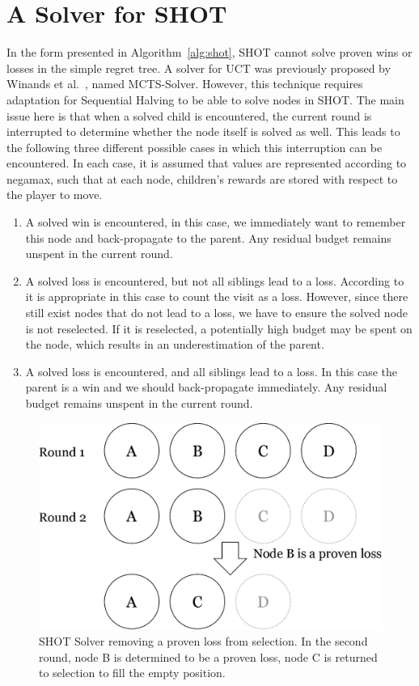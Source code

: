 \documentclass{icga}
\begin{document}
\section{A Solver for SHOT}
\label{sec:shotsolver}

In the form presented in Algorithm~\ref{alg:shot}, SHOT cannot solve proven wins or losses in the simple regret tree. A solver for UCT was previously proposed by Winands et al.~, named MCTS-Solver. However, this technique requires adaptation for Sequential Halving to be able to solve nodes in SHOT. The main issue here is that when a solved child is encountered, the current round is interrupted to determine whether the node itself is solved as well. This leads to the following three different possible cases in which this interruption can be encountered. In each case, it is assumed that values are represented according to negamax, such that at each node, children's rewards are stored with respect to the player to move.
\begin{enumerate}
\item A solved win is encountered, in this case, we immediately want to remember this node and back-propagate to the parent. Any residual budget remains unspent in the current round.
\item A solved loss is encountered, but not all siblings lead to a loss. According to~ it is appropriate in this case to count the visit as a loss. However, since there still exist nodes that do not lead to a loss, we have to ensure the solved node is not reselected. If it is reselected, a potentially high budget may be spent on the node, which results in an underestimation of the parent.
\item A solved loss is encountered, and all siblings lead to a loss. In this case the parent is a win and we should back-propagate immediately. Any residual budget remains unspent in the current round.
\end{enumerate}
\begin{figure}[ht]
	\centering
	\includegraphics[width=.6\textwidth]{img/solver.png}
	\caption[SHOT Solver example]{SHOT Solver removing a proven loss from selection. In the second round, node B is determined to be a proven loss, node C is returned to selection to fill the empty position.}
	\label{fig:shot_solver}
\end{figure}
\end{document}
